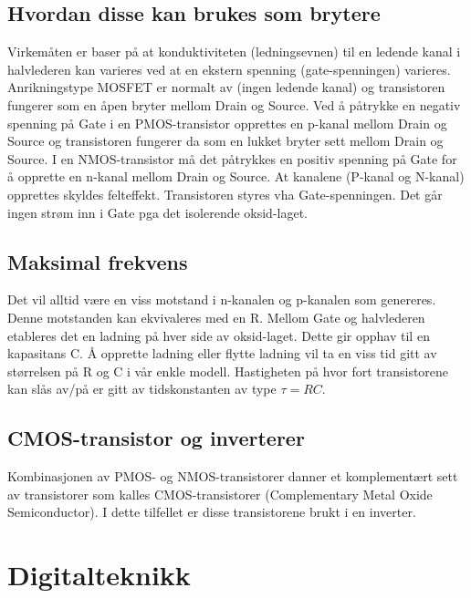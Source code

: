 \documentclass{article}
\begin{document}
\subsection{Hvordan disse kan brukes som brytere}
Virkemåten er baser på at konduktiviteten (ledningsevnen) til en ledende kanal i 
halvlederen kan varieres ved at en ekstern spenning (gate-spenningen) varieres. 
Anrikningstype MOSFET er normalt av (ingen ledende kanal) og transistoren 
fungerer som en åpen bryter mellom Drain og Source.
Ved å påtrykke en negativ spenning på Gate i en PMOS-transistor opprettes en p-kanal mellom Drain og Source og transistoren fungerer da som en lukket bryter sett 
mellom Drain og Source. I en NMOS-transistor må det påtrykkes en positiv spenning 
på Gate for å opprette en n-kanal mellom Drain og Source.
At kanalene (P-kanal og N-kanal) opprettes skyldes felteffekt.
Transistoren styres vha Gate-spenningen. Det går ingen strøm inn i Gate pga det 
isolerende oksid-laget.
\subsection{Maksimal frekvens}
Det vil alltid være en viss motstand i n-kanalen og p-kanalen som genereres. Denne 
motstanden kan ekvivaleres med en R.
Mellom Gate og halvlederen etableres det en ladning på hver side av oksid-laget. 
Dette gir opphav til en kapasitans C. Å opprette ladning eller flytte ladning vil ta en viss tid gitt av størrelsen på R og C i 
vår enkle modell. Hastigheten på hvor fort transistorene kan slås av/på er gitt av 
tidskonstanten av type $\tau = RC$.
\subsection{CMOS-transistor og inverterer}
Kombinasjonen av PMOS- og NMOS-transistorer danner et komplementært sett av 
transistorer som kalles CMOS-transistorer (Complementary Metal Oxide 
Semiconductor). I dette tilfellet er disse transistorene brukt i en inverter.

\section{Digitalteknikk}
\end{document}
